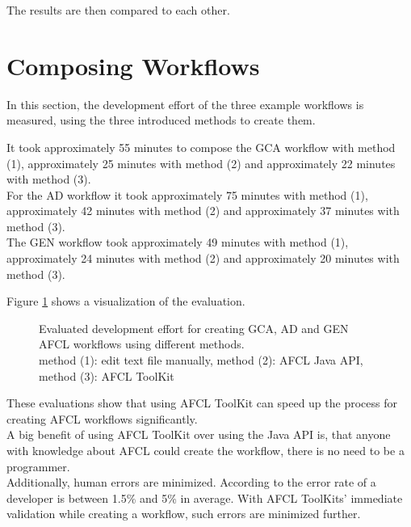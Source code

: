 \documentclass[a4paper,top=25mm,bottom=25mm,12pt,pdftex,halfparskip,twoside,bibtotoc,numbers=noenddot]{scrbook}
\begin{document}
The results are then compared to each other.

\section{Composing Workflows}

In this section, the development effort of the three example workflows is measured, using the three introduced methods to create them.

It took approximately 55 minutes to compose the GCA workflow with method (1), approximately 25 minutes with method (2) and approximately 22 minutes with method (3).\\
For the AD workflow it took approximately 75 minutes with method (1), approximately 42 minutes with method (2) and approximately 37 minutes with method (3).\\
The GEN workflow took approximately 49 minutes with method (1), approximately 24 minutes with method (2) and approximately 20 minutes with method (3).

Figure \ref{fig:evaluation-developmenteffort} shows a visualization of the evaluation.

\begin{figure}
\caption{Evaluated development effort for creating GCA, AD and GEN AFCL workflows using different methods.\\ \small{method (1): edit text file manually, method (2): AFCL Java API, method (3): AFCL ToolKit}}
\label{fig:evaluation-developmenteffort}
\end{figure}

These evaluations show that using AFCL ToolKit can speed up the process for creating AFCL workflows significantly.\\
A big benefit of using AFCL ToolKit over using the Java API is, that anyone with knowledge about AFCL could create the workflow, there is no need to be a programmer.\\
Additionally, human errors are minimized. According to \cite{books-code-complete-mcconnell} the error rate of a developer is between 1.5\% and 5\% in average.
With AFCL ToolKits' immediate validation while creating a workflow, such errors are minimized further. 
\end{document}
